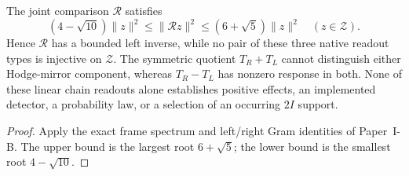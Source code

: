 \documentclass[12pt,a4paper]{article}
\begin{document}
\begin{proposition}
\label{p2:prop:v345-f40-readout-scope}
The joint comparison $\mathcal R$ satisfies
\[
 (4-\sqrt{10})\|z\|^2\leq\|\mathcal Rz\|^2
 \leq(6+\sqrt5)\|z\|^2\quad(z\in\mathcal Z).
\]
Hence $\mathcal R$ has a bounded left inverse, while no pair
of these three native readout types is injective on $\mathcal Z$.
The symmetric quotient $T_R+T_L$ cannot distinguish either
Hodge-mirror component, whereas $T_R-T_L$ has nonzero response
in both.  None of these linear chain readouts alone establishes
positive effects, an implemented detector, a probability law,
or a selection of an occurring $2I$ support.
\end{proposition}
\begin{proof}
Apply the exact frame spectrum and left/right Gram identities of
Paper~I-B.  The upper bound is the largest root $6+\sqrt5$;
the lower bound is the smallest root $4-\sqrt{10}$.
\end{proof}
\end{document}
